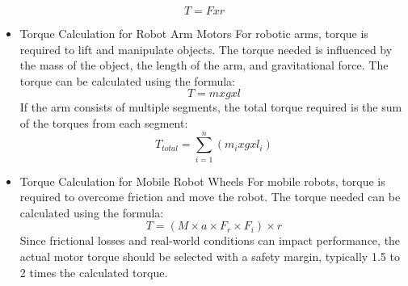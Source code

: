 \begin{equation}
T = F x r
\label{eq:2.1}
\end{equation}


\begin{itemize}
\item Torque Calculation for Robot Arm Motors
For robotic arms, torque is required to lift and manipulate objects. The torque needed is influenced by the mass of the object, the length of the arm, and gravitational force. The torque can be calculated using the formula:
    \begin{equation}
    T = m x g x l
    \label{eq:2.2}
    \end{equation}
If the arm consists of multiple segments, the total torque required is 
the sum of the torques from each segment: 
    \begin{equation}
    T_{total} = \sum_{i=1}^{n} (m_i x g x l_i)
    \label{eq:2.3}
    \end{equation}
    

    


\item Torque Calculation for Mobile Robot Wheels
For mobile robots, torque is required to overcome friction and move the robot. The torque needed can be calculated using the formula:
    \begin{equation}
    T = (M \times a \times F_r \times F_i) \times r
    \label{eq:2.4}
    \end{equation}
Since frictional losses and real-world conditions can impact performance, the actual motor torque should be selected with a safety margin, typically 1.5 to 2 times the calculated torque.
\end{itemize}


